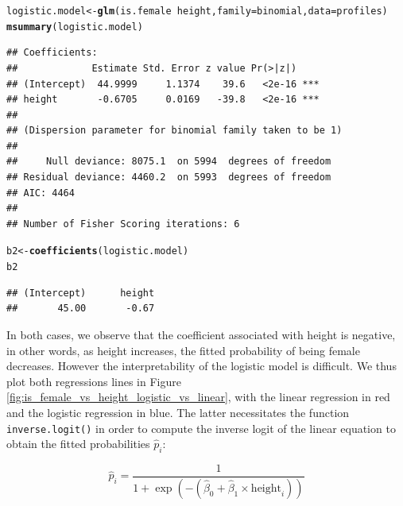 \documentclass{article}\usepackage[]{graphicx}\usepackage[]{color}
\makeatletter
\newcommand{\hlopt}[1]{\textcolor[rgb]{0,0,0}{#1}}%
\newcommand{\hlstd}[1]{\textcolor[rgb]{0.345,0.345,0.345}{#1}}%
\newcommand{\hlkwb}[1]{\textcolor[rgb]{0.69,0.353,0.396}{#1}}%
\newcommand{\hlkwc}[1]{\textcolor[rgb]{0.333,0.667,0.333}{#1}}%
\newcommand{\hlkwd}[1]{\textcolor[rgb]{0.737,0.353,0.396}{\textbf{#1}}}%
\newenvironment{kframe}{%
 \def\at@end@of@kframe{}%
 \ifinner\ifhmode%
  \def\at@end@of@kframe{\end{minipage}}%
  \begin{minipage}{\columnwidth}%
 \fi\fi%
 \def\FrameCommand##1{\hskip\@totalleftmargin \hskip-\fboxsep
 \colorbox{shadecolor}{##1}\hskip-\fboxsep
     \hskip-\linewidth \hskip-\@totalleftmargin \hskip\columnwidth}%
 \MakeFramed {\advance\hsize-\width
   \@totalleftmargin\z@ \linewidth\hsize
   \@setminipage}}%
 {\par\unskip\endMakeFramed%
 \at@end@of@kframe}
\newenvironment{knitrout}{}{} %
\makeatother
\begin{document}
\begin{knitrout}
\color{fgcolor}\begin{kframe}
\begin{alltt}
\hlstd{logistic.model} \hlkwb{<-} \hlkwd{glm}\hlstd{(is.female} \hlopt{~} \hlstd{height,} \hlkwc{family}\hlstd{=binomial,} \hlkwc{data}\hlstd{=profiles)}
\hlkwd{msummary}\hlstd{(logistic.model)}
\end{alltt}
\begin{verbatim}
## Coefficients:
##             Estimate Std. Error z value Pr(>|z|)    
## (Intercept)  44.9999     1.1374    39.6   <2e-16 ***
## height       -0.6705     0.0169   -39.8   <2e-16 ***
## 
## (Dispersion parameter for binomial family taken to be 1)
## 
##     Null deviance: 8075.1  on 5994  degrees of freedom
## Residual deviance: 4460.2  on 5993  degrees of freedom
## AIC: 4464
## 
## Number of Fisher Scoring iterations: 6
\end{verbatim}
\begin{alltt}
\hlstd{b2} \hlkwb{<-} \hlkwd{coefficients}\hlstd{(logistic.model)}
\hlstd{b2}
\end{alltt}
\begin{verbatim}
## (Intercept)      height 
##       45.00       -0.67
\end{verbatim}
\end{kframe}
\end{knitrout}

In both cases, we observe that the coefficient associated with height is negative, in other words, as height increases, the fitted probability of being female decreases.  However the interpretability of the logistic model is difficult.  We thus plot both regressions lines in Figure \ref{fig:is_female_vs_height_logistic_vs_linear}, with the linear regression in red and the logistic regression in blue.  The latter necessitates the function \verb#inverse.logit()# in order to compute the inverse logit of the linear equation to obtain the fitted probabilities $\widehat{p}_i$:

\[
\widehat{p}_i = \frac{1}{1+\exp\left(-(\widehat{\beta}_0 + \widehat{\beta}_1 \times \mbox{height}_i)\right)}
\]
\end{document}
